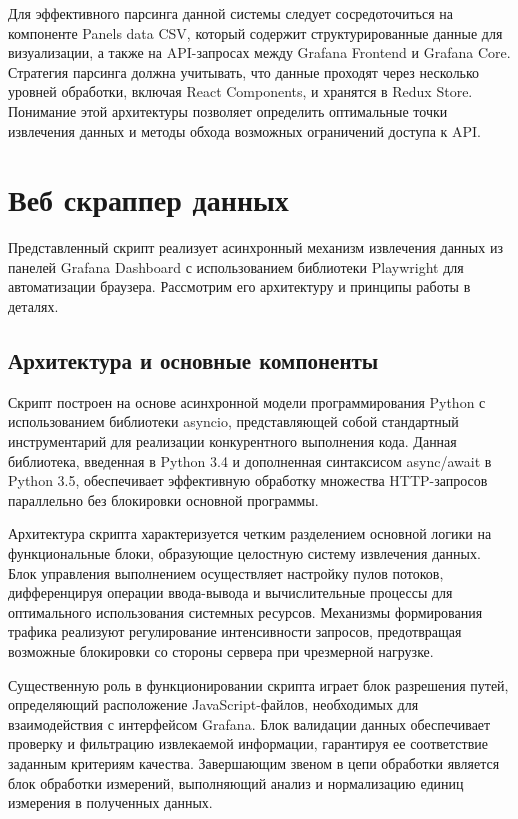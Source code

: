 Для эффективного парсинга данной системы следует сосредоточиться на компоненте
Panels data CSV, который содержит структурированные данные для визуализации, а
также на API-запросах между Grafana Frontend и Grafana Core. Стратегия парсинга
должна учитывать, что данные проходят через несколько уровней обработки,
включая React Components, и хранятся в Redux Store. Понимание этой архитектуры
позволяет определить оптимальные точки извлечения данных и методы обхода
возможных ограничений доступа к API.

\section{Веб скраппер данных}

Представленный скрипт реализует асинхронный механизм извлечения данных из
панелей Grafana Dashboard с использованием библиотеки Playwright для
автоматизации браузера. Рассмотрим его архитектуру и принципы работы в деталях.

\subsection{Архитектура и основные компоненты}

Скрипт построен на основе асинхронной модели программирования Python с
использованием библиотеки asyncio, представляющей собой стандартный
инструментарий для реализации конкурентного выполнения кода. Данная библиотека,
введенная в Python 3.4 и дополненная синтаксисом async/await в Python 3.5,
обеспечивает эффективную обработку множества HTTP-запросов параллельно без
блокировки основной программы.

Архитектура скрипта характеризуется четким разделением основной логики на
функциональные блоки, образующие целостную систему извлечения данных. Блок
управления выполнением осуществляет настройку пулов потоков, дифференцируя
операции ввода-вывода и вычислительные процессы для оптимального использования
системных ресурсов. Механизмы формирования трафика реализуют регулирование
интенсивности запросов, предотвращая возможные блокировки со стороны сервера при
чрезмерной нагрузке.

Существенную роль в функционировании скрипта играет блок разрешения путей,
определяющий расположение JavaScript-файлов, необходимых для взаимодействия с
интерфейсом Grafana. Блок валидации данных обеспечивает проверку и фильтрацию
извлекаемой информации, гарантируя ее соответствие заданным критериям качества.
Завершающим звеном в цепи обработки является блок обработки измерений,
выполняющий анализ и нормализацию единиц измерения в полученных данных.

